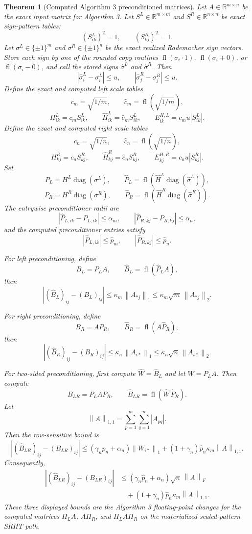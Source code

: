 \documentclass[11pt]{article}
\newcommand{\R}{\mathbb{R}}
\newcommand{\Frob}[1]{\left\lVert #1\right\rVert_F}
\newcommand{\Norm}[1]{\left\lVert #1\right\rVert_2}
\newcommand{\NormOne}[1]{\left\lVert #1\right\rVert_1}
\newcommand{\EntryOne}[1]{\left\lVert #1\right\rVert_{1,1}}
\newcommand{\fl}{\operatorname{fl}}
\newcommand{\diag}{\operatorname{diag}}
\newtheorem{theorem}{Theorem}
\theoremstyle{remark}
\begin{document}
\begin{theorem}[Computed Algorithm 3 preconditioned matrices]
Let \(A\in\R^{m\times n}\) be the exact input matrix for Algorithm 3.  Let
\(S^L\in\R^{m\times m}\) and \(S^R\in\R^{n\times n}\) be exact sign-pattern
tables:
\[
  (S^L_{ik})^2=1,\qquad (S^R_{kj})^2=1 .
\]
Let \(\sigma^L\in\{\pm1\}^m\) and \(\sigma^R\in\{\pm1\}^n\) be the exact
realized Rademacher sign vectors.  Store each sign by one of the rounded copy
routines \(\fl(\sigma_i\cdot1)\), \(\fl(\sigma_i+0)\), or
\(\fl(\sigma_i-0)\), and call the stored signs
\(\widehat\sigma^L\) and \(\widehat\sigma^R\).  Then
\[
  |\widehat\sigma^L_i-\sigma^L_i|\le u,\qquad
  |\widehat\sigma^R_j-\sigma^R_j|\le u .
\]
Define the exact and computed left scale tables
\[
  c_m=\sqrt{1/m},\qquad \widehat c_m=\fl(\sqrt{1/m}),
\]
\[
  H^L_{ik}=c_mS^L_{ik},\qquad
  \widehat H^L_{ik}=\widehat c_mS^L_{ik},
  \qquad
  E^{H,L}_{ik}=c_mu|S^L_{ik}|.
\]
Define the exact and computed right scale tables
\[
  c_n=\sqrt{1/n},\qquad \widehat c_n=\fl(\sqrt{1/n}),
\]
\[
  H^R_{kj}=c_nS^R_{kj},\qquad
  \widehat H^R_{kj}=\widehat c_nS^R_{kj},
  \qquad
  E^{H,R}_{kj}=c_nu|S^R_{kj}|.
\]
Set
\[
  P_L=H^L\diag(\sigma^L),\qquad
  \widehat P_L=\fl(\widehat H^L\diag(\widehat\sigma^L)),
\]
\[
  P_R=H^R\diag(\sigma^R),\qquad
  \widehat P_R=\fl(\widehat H^R\diag(\widehat\sigma^R)).
\]
The entrywise preconditioner radii are
\[
  |\widehat P_{L,ik}-P_{L,ik}|\le \alpha_m,
  \qquad
  |\widehat P_{R,kj}-P_{R,kj}|\le \alpha_n,
\]
and the computed preconditioner entries satisfy
\[
  |\widehat P_{L,ik}|\le\widehat p_m,
  \qquad
  |\widehat P_{R,kj}|\le\widehat p_n .
\]

For left preconditioning, define
\[
  B_L=P_LA,\qquad \widehat B_L=\fl(\widehat P_LA),
\]
then
\[
  |(\widehat B_L)_{ij}-(B_L)_{ij}|
  \le
  \kappa_m\,\NormOne{A_{*j}}
  \le
  \kappa_m\sqrt m\,\Norm{A_{*j}} .
\]

For right preconditioning, define
\[
  B_R=AP_R,\qquad \widehat B_R=\fl(A\widehat P_R),
\]
then
\[
  |(\widehat B_R)_{ij}-(B_R)_{ij}|
  \le
  \kappa_n\,\NormOne{A_{i*}}
  \le
  \kappa_n\sqrt n\,\Norm{A_{i*}} .
\]

For two-sided preconditioning, first compute \(\widehat W=\widehat B_L\) and
let \(W=P_LA\).  Then compute
\[
  B_{LR}=P_LAP_R,\qquad
  \widehat B_{LR}=\fl(\widehat W\,\widehat P_R).
\]
Let
\[
  \EntryOne{A}=\sum_{p=1}^m\sum_{q=1}^n |A_{pq}|.
\]
Then the row-sensitive bound is
\[
  |(\widehat B_{LR})_{ij}-(B_{LR})_{ij}|
  \le
  (\gamma_n\widehat p_n+\alpha_n)\NormOne{W_{i*}}
  +
  (1+\gamma_n)\widehat p_n\kappa_m\EntryOne{A}.
\]
Consequently,
\[
\begin{aligned}
  |(\widehat B_{LR})_{ij}-(B_{LR})_{ij}|
  &\le
  (\gamma_n\widehat p_n+\alpha_n)\sqrt n\,\Frob{A}
  \\
  &\quad+
  (1+\gamma_n)\widehat p_n\kappa_m\EntryOne{A}.
\end{aligned}
\]
These three displayed bounds are the Algorithm 3 floating-point changes for
the computed matrices \(\Pi_LA\), \(A\Pi_R\), and \(\Pi_LA\Pi_R\) on the
materialized scaled-pattern SRHT path.
\end{theorem}
\end{document}
